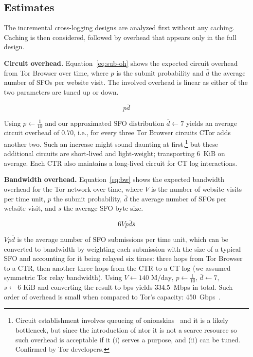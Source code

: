 \subsection{Estimates} \label{sec:performance:estimates}
The incremental cross-logging designs are analyzed first without any caching.
Caching is then considered, followed by overhead that appears only in the full
design.

\textbf{Circuit overhead.}
Equation~\ref{eq:sub-oh} shows the expected circuit overhead from Tor Browser
over time, where $p$ is the submit probability and $\bar{d}$ the average number
of SFOs per website visit.  The involved overhead is linear as either of the two
parameters are tuned up or down.

\begin{equation} \label{eq:sub-oh}
	p\bar{d}
\end{equation}

Using $p\gets\frac{1}{10}$ and our approximated SFO distribution $\bar{d}\gets7$
yields an average circuit overhead of $0.70$, i.e., for every three Tor Browser
circuits CTor adds another two.  Such an increase might sound
daunting at first,\footnote{%
	Circuit establishment involves queueing of onionskins~\cite{onionskins} and
	it is a likely bottleneck, but since the introduction of ntor it is not a
	scarce resource so such overhead is acceptable if it (i) serves a purpose,
	and (ii) can be tuned.  Confirmed by Tor developers.
} but these additional circuits are short-lived and light-weight; transporting
6~KiB on average.  Each CTR also maintains a long-lived circuit for CT log
interactions.

\textbf{Bandwidth overhead.}  Equation~\ref{eq:bw} shows the expected
bandwidth overhead for the Tor network over time, where
	$V$ is the number of website visits per time unit,
	$p$ the submit probability,
	$\bar{d}$ the average number of SFOs per website visit, and
	$\bar{s}$ the average SFO byte-size.

\begin{equation} \label{eq:bw}
	6Vp\bar{d}\bar{s}
\end{equation}

$Vp\bar{d}$ is the average number of SFO submissions per time unit, which can be
converted to bandwidth by weighting each submission with the size of
a typical SFO and accounting for it being relayed six times:
	three hops from Tor Browser to a CTR, then
	another three hops from the CTR to a CT log
	(we assumed symmetric Tor relay bandwidth).
Using
	$V\gets 140\textrm{~M/day}$,
	$p \gets \frac{1}{10}$,
	$\bar{d} \gets 7$,
	$\bar{s} \gets 6\textrm{~KiB}$
and converting the result to bps yields 334.5~Mbps in total.  Such order of
overhead is small when compared to Tor's capacity:
450~Gbps~\cite{tor-bandwidth}.

